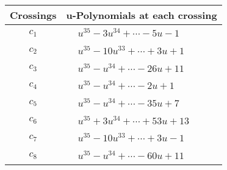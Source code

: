 \documentclass[1p]{elsarticle_modified}
\theoremstyle{definition}
\begin{document}
\begin{tabular}{m{50pt}|m{274pt}}
Crossings & \hspace{64pt}u-Polynomials at each crossing \\
\hline $$\begin{aligned}c_{1}\end{aligned}$$&$\begin{aligned}
&u^{35}-3 u^{34}+\cdots-5 u-1
\end{aligned}$\\
\hline $$\begin{aligned}c_{2}\end{aligned}$$&$\begin{aligned}
&u^{35}-10 u^{33}+\cdots+3 u+1
\end{aligned}$\\
\hline $$\begin{aligned}c_{3}\end{aligned}$$&$\begin{aligned}
&u^{35}- u^{34}+\cdots-26 u+11
\end{aligned}$\\
\hline $$\begin{aligned}c_{4}\end{aligned}$$&$\begin{aligned}
&u^{35}- u^{34}+\cdots-2 u+1
\end{aligned}$\\
\hline $$\begin{aligned}c_{5}\end{aligned}$$&$\begin{aligned}
&u^{35}- u^{34}+\cdots-35 u+7
\end{aligned}$\\
\hline $$\begin{aligned}c_{6}\end{aligned}$$&$\begin{aligned}
&u^{35}+3 u^{34}+\cdots+53 u+13
\end{aligned}$\\
\hline $$\begin{aligned}c_{7}\end{aligned}$$&$\begin{aligned}
&u^{35}-10 u^{33}+\cdots+3 u-1
\end{aligned}$\\
\hline $$\begin{aligned}c_{8}\end{aligned}$$&$\begin{aligned}
&u^{35}- u^{34}+\cdots-60 u+11
\end{aligned}$\\

\end{tabular}
\end{document}

